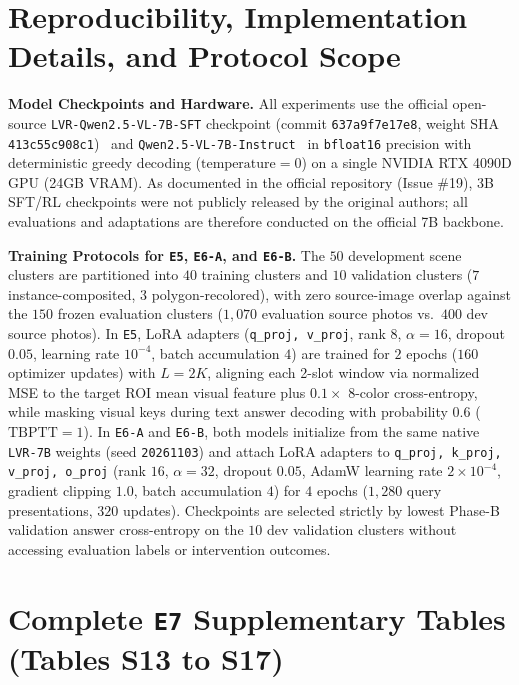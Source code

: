 \section{Reproducibility, Implementation Details, and Protocol Scope}
\label{app:reproducibility}

\textbf{Model Checkpoints and Hardware.} All experiments use the official open-source \texttt{LVR-Qwen2.5-VL-7B-SFT} checkpoint (commit \texttt{637a9f7e17e8}, weight SHA \texttt{413c55c908c1})~\cite{li2026lvr} and \texttt{Qwen2.5-VL-7B-Instruct}~\cite{bai2025qwen25vl} in \texttt{bfloat16} precision with deterministic greedy decoding ($\text{temperature}=0$) on a single NVIDIA RTX 4090D GPU (24GB VRAM). As documented in the official repository (Issue \#19), 3B SFT/RL checkpoints were not publicly released by the original authors; all evaluations and adaptations are therefore conducted on the official 7B backbone.

\textbf{Training Protocols for \texttt{E5}, \texttt{E6-A}, and \texttt{E6-B}.}
The $50$ development scene clusters are partitioned into $40$ training clusters and $10$ validation clusters ($7$ instance-composited, $3$ polygon-recolored), with zero source-image overlap against the $150$ frozen evaluation clusters ($1,070$ evaluation source photos vs.\ $400$ dev source photos).
In \texttt{E5}, LoRA adapters (\texttt{q\_proj, v\_proj}, rank $8$, $\alpha=16$, dropout $0.05$, learning rate $10^{-4}$, batch accumulation $4$) are trained for $2$ epochs ($160$ optimizer updates) with $L=2K$, aligning each 2-slot window via normalized MSE to the target ROI mean visual feature plus $0.1\times$ 8-color cross-entropy, while masking visual keys during text answer decoding with probability $0.6$ ($\mathrm{TBPTT}=1$).
In \texttt{E6-A} and \texttt{E6-B}, both models initialize from the same native \texttt{LVR-7B} weights (seed \texttt{20261103}) and attach LoRA adapters to \texttt{q\_proj, k\_proj, v\_proj, o\_proj} (rank $16$, $\alpha=32$, dropout $0.05$, AdamW learning rate $2\times 10^{-4}$, gradient clipping $1.0$, batch accumulation $4$) for $4$ epochs ($1,280$ query presentations, $320$ updates). Checkpoints are selected strictly by lowest Phase-B validation answer cross-entropy on the $10$ dev validation clusters without accessing evaluation labels or intervention outcomes.

\section{Complete \texttt{E7} Supplementary Tables (Tables S13 to S17)}
\label{app:e7_tables}

